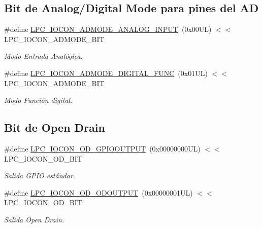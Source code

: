 \subsection*{Bit de Analog/\+Digital Mode para pines del AD}
\begin{DoxyCompactItemize}
\item 
\#define \hyperlink{group___l_p_c___i_o_c_o_n___l_p_c1102___h_y_s___o_d_gae05ef528eeed5af0eea9cc5e203a31a4}{L\+P\+C\+\_\+\+I\+O\+C\+O\+N\+\_\+\+A\+D\+M\+O\+D\+E\+\_\+\+A\+N\+A\+L\+O\+G\+\_\+\+I\+N\+P\+UT}~(0x00\+U\+L) $<$$<$ L\+P\+C\+\_\+\+I\+O\+C\+O\+N\+\_\+\+A\+D\+M\+O\+D\+E\+\_\+\+B\+IT
\begin{DoxyCompactList}\small\item\em Modo Entrada Analógica. \end{DoxyCompactList}\item 
\#define \hyperlink{group___l_p_c___i_o_c_o_n___l_p_c1102___h_y_s___o_d_ga1d822fd7d3c5e53a4f1b5e28c0592927}{L\+P\+C\+\_\+\+I\+O\+C\+O\+N\+\_\+\+A\+D\+M\+O\+D\+E\+\_\+\+D\+I\+G\+I\+T\+A\+L\+\_\+\+F\+U\+NC}~(0x01\+U\+L) $<$$<$ L\+P\+C\+\_\+\+I\+O\+C\+O\+N\+\_\+\+A\+D\+M\+O\+D\+E\+\_\+\+B\+IT
\begin{DoxyCompactList}\small\item\em Modo Función digital. \end{DoxyCompactList}\end{DoxyCompactItemize}
\subsection*{Bit de Open Drain}
\begin{DoxyCompactItemize}
\item 
\#define \hyperlink{group___l_p_c___i_o_c_o_n___l_p_c1102___h_y_s___o_d_gaf7d9ed14d2e3855efb3f6c259d67aba2}{L\+P\+C\+\_\+\+I\+O\+C\+O\+N\+\_\+\+O\+D\+\_\+\+G\+P\+I\+O\+O\+U\+T\+P\+UT}~(0x00000000\+U\+L) $<$$<$ L\+P\+C\+\_\+\+I\+O\+C\+O\+N\+\_\+\+O\+D\+\_\+\+B\+IT
\begin{DoxyCompactList}\small\item\em Salida G\+P\+IO estándar. \end{DoxyCompactList}\item 
\#define \hyperlink{group___l_p_c___i_o_c_o_n___l_p_c1102___h_y_s___o_d_ga78db812d9390dabe4c8fe7d68fc0013f}{L\+P\+C\+\_\+\+I\+O\+C\+O\+N\+\_\+\+O\+D\+\_\+\+O\+D\+O\+U\+T\+P\+UT}~(0x00000001\+U\+L) $<$$<$ L\+P\+C\+\_\+\+I\+O\+C\+O\+N\+\_\+\+O\+D\+\_\+\+B\+IT
\begin{DoxyCompactList}\small\item\em Salida Open Drain. \end{DoxyCompactList}\end{DoxyCompactItemize}


